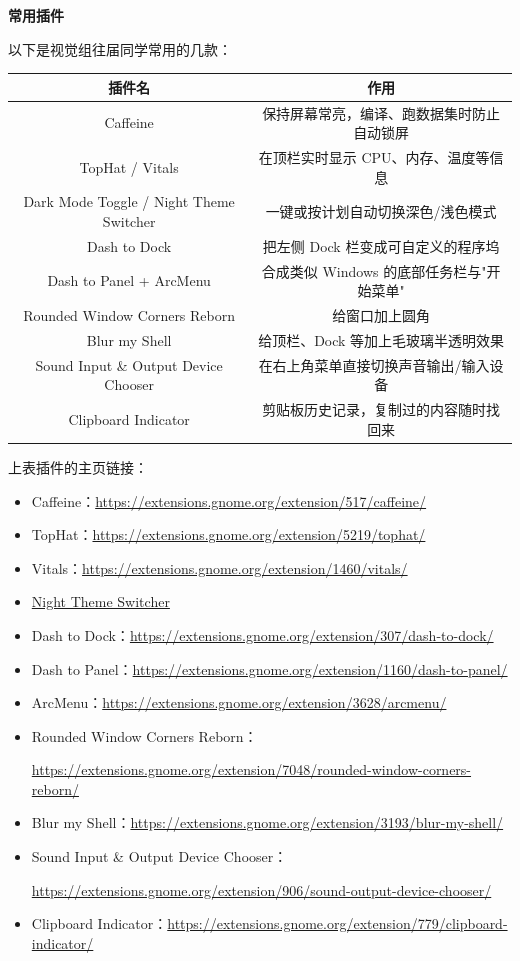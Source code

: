 \textbf{常用插件}

以下是视觉组往届同学常用的几款：

\begin{center}
\begin{tabular}{cc}
\toprule[1.5pt]
插件名 & 作用\\
\midrule[1pt]
Caffeine & 保持屏幕常亮，编译、跑数据集时防止自动锁屏\\
TopHat / Vitals & 在顶栏实时显示 CPU、内存、温度等信息\\
Dark Mode Toggle / Night Theme Switcher & 一键或按计划自动切换深色/浅色模式\\
Dash to Dock & 把左侧 Dock 栏变成可自定义的程序坞\\
Dash to Panel + ArcMenu & 合成类似 Windows 的底部任务栏与"开始菜单"\\
Rounded Window Corners Reborn & 给窗口加上圆角\\
Blur my Shell & 给顶栏、Dock 等加上毛玻璃半透明效果\\
Sound Input \& Output Device Chooser & 在右上角菜单直接切换声音输出/输入设备\\
Clipboard Indicator & 剪贴板历史记录，复制过的内容随时找回来\\
\bottomrule[1.5pt]
\end{tabular}
\end{center}

\begin{note}
上表插件的主页链接：

\begin{itemize}
\item Caffeine：\url{https://extensions.gnome.org/extension/517/caffeine/}
\item TopHat：\url{https://extensions.gnome.org/extension/5219/tophat/}
\item Vitals：\url{https://extensions.gnome.org/extension/1460/vitals/}
\item \href{https://extensions.gnome.org/extension/2236/night-theme-switcher/}{Night Theme Switcher}
\item Dash to Dock：\url{https://extensions.gnome.org/extension/307/dash-to-dock/}
\item Dash to Panel：\url{https://extensions.gnome.org/extension/1160/dash-to-panel/}
\item ArcMenu：\url{https://extensions.gnome.org/extension/3628/arcmenu/}
\item Rounded Window Corners Reborn：\par
\url{https://extensions.gnome.org/extension/7048/rounded-window-corners-reborn/}
\item Blur my Shell：\url{https://extensions.gnome.org/extension/3193/blur-my-shell/}
\item Sound Input \& Output Device Chooser：\par
\url{https://extensions.gnome.org/extension/906/sound-output-device-chooser/}
\item Clipboard Indicator：\url{https://extensions.gnome.org/extension/779/clipboard-indicator/}
\end{itemize}
\end{note}

